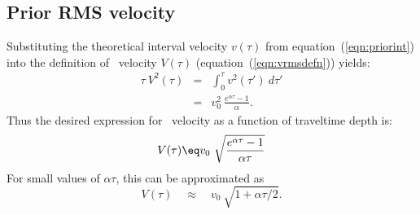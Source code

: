 \subsection{Prior RMS velocity}
Substituting the theoretical interval velocity $v(\tau)$
from equation~(\ref{eqn:priorint})
into the definition of
\RMS\ velocity $V(\tau)$
(equation~(\ref{eqn:vrmsdefn}))
yields:
\begin{eqnarray}
\tau \ V^2(\tau) &=& \int_{0}^{\tau} v^2(\tau') \ d \tau'
\\
               &=& v_0^2 \ \frac {e^{\alpha \tau} - 1} {\alpha} .
\end{eqnarray}
Thus the desired expression for \RMS\ velocity
as a function of traveltime depth is:
\begin{equation}
V(\tau) \eq v_0 \
        \sqrt{
        \frac{e^{\alpha \tau} - 1 }{\alpha \tau}
        }
\label{eqn:Vrms}
\end{equation}
For small values of $\alpha \tau$,
this can be approximated as
\begin{equation}
V(\tau) \quad\approx \quad v_0\ \sqrt{1 + \alpha \tau / 2}  .
\end{equation}

